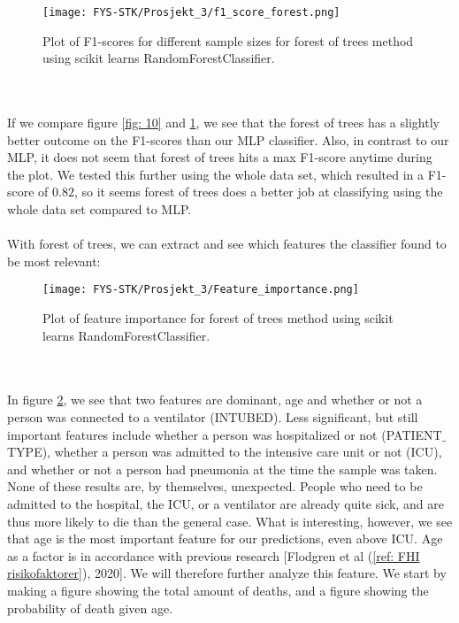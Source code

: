 \documentclass[english,notitlepage,reprint,nofootinbib]{revtex4-1}  %
\begin{document}
\begin{figure}[H]
    \centering
    \texttt{[image: FYS-STK/Prosjekt\_3/f1\_score\_forest.png]}
    \caption{Plot of F1-scores for different sample sizes for forest of trees method using scikit learns RandomForestClassifier.}
    \label{fig: 11}
\end{figure}
\\
\\
If we compare figure \ref{fig: 10} and \ref{fig: 11}, we see that the forest of trees has a slightly better outcome on the F1-scores than our MLP classifier. Also, in contrast to our MLP, it does not seem that forest of trees hits a max F1-score anytime during the plot. We tested this further using the whole data set, which resulted in a F1-score of $0.82$, so it seems forest of trees does a better job at classifying using the whole data set compared to MLP. %
\\
\\
With forest of trees, we can extract and see which features the classifier found to be most relevant:
\begin{figure}[H]
    \centering
    \texttt{[image: FYS-STK/Prosjekt\_3/Feature\_importance.png]}
    \caption{Plot of feature importance for forest of trees method using scikit learns RandomForestClassifier.}
    \label{fig: 12}
\end{figure}
\\
\\
In figure \ref{fig: 12}, we see that two features are dominant, age and whether or not a person was connected to a ventilator (INTUBED). Less significant, but still important features include whether a person was hospitalized or not (PATIENT$\_$TYPE), whether a person was admitted to the intensive care unit or not (ICU), and whether or not a person had pneumonia at the time the sample was taken. None of these results are, by themselves, unexpected. People who need to be admitted to the hospital, the ICU, or a ventilator are already quite sick, and are thus more likely to die than the general case. What is interesting, however, 
we see that age is the most important feature for our predictions, even above ICU. Age as a factor is in accordance with previous research [Flodgren et al (\ref{ref: FHI risikofaktorer}), 2020]. We will therefore further analyze this feature. We start by making a figure showing the total amount of deaths, and a figure showing the probability of death given age.
\end{document}

